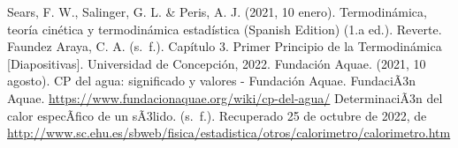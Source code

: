 \documentclass[a4paper, 12p]{article}
\begin{document}
\begin{thebibliography}{6}
       Sears, F. W., Salinger, G. L. \& Peris, A. J. (2021, 10 enero). Termodinámica, teoría cinética y termodinámica estadística (Spanish Edition) (1.a ed.). Reverte.
       Faundez Araya, C. A. (s. f.). Capítulo 3. Primer Principio de la Termodinámica [Diapositivas]. Universidad de Concepción, 2022.
      Fundación Aquae. (2021, 10 agosto). CP del agua: significado y valores - Fundación Aquae. FundaciÃ3n Aquae. 
      \url{https://www.fundacionaquae.org/wiki/cp-del-agua/}
      DeterminaciÃ3n del calor especÃ­fico de un sÃ3lido. (s. f.). Recuperado 25 de octubre de 2022,
       de \url{http://www.sc.ehu.es/sbweb/fisica/estadistica/otros/calorimetro/calorimetro.htm}
\end{thebibliography}
\end{document}
